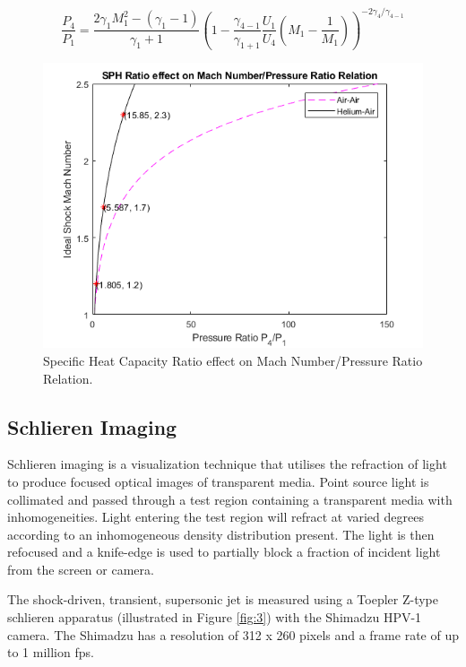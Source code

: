 \begin{equation} \label{shock}
\frac{P_4}{P_1} = \frac{2\gamma_1M_1^2 - (\gamma_1 - 1)}{\gamma_1 + 1}\left(1 - \frac{\gamma_{4-1}}{\gamma_{1+1}}\frac{U_1}{U_4}\left(M_1 - \frac{1}{M_1}\right)\right)^{-2\gamma_4/\gamma_{4-1}}
\end{equation}

\begin{figure}[H] 
	\centering
	\includegraphics[scale=0.9]{fig1.png} 
	\caption{Specific Heat Capacity Ratio effect on Mach Number/Pressure Ratio Relation.}
	\label{fig:gas_relation}
\end{figure}

\subsection{Schlieren Imaging}
Schlieren imaging is a visualization technique that utilises the refraction of light to produce focused optical images of transparent media. Point source light is collimated and passed through a test region containing a transparent media with inhomogeneities.  Light entering the test region will refract at varied degrees according to an inhomogeneous density distribution present. The light is then refocused and a knife-edge is used to partially block a fraction of incident light from the screen or camera.

The shock-driven, transient, supersonic jet is measured using a Toepler Z-type schlieren apparatus \cite{settles2001schlieren} (illustrated in Figure \ref{fig:3}) with the Shimadzu HPV-1 camera. The Shimadzu has a resolution of 312 x 260 pixels and a frame rate of up to 1 million fps. 

